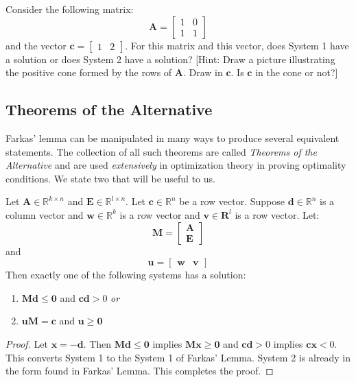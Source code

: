 \begin{exercise} Consider the following matrix: 
\begin{displaymath}
\mathbf{A} = \begin{bmatrix}
1 & 0\\
1 & 1
\end{bmatrix}
\end{displaymath}
and the vector $\mathbf{c} = \begin{bmatrix}1 & 2\end{bmatrix}$. For this matrix and this vector, does System 1 have a solution or does System 2 have a solution? [Hint: Draw a picture illustrating the positive cone formed by the rows of $\mathbf{A}$. Draw in $\mathbf{c}$. Is $\mathbf{c}$ in the cone or not?]
\end{exercise}

\subsection{Theorems of the Alternative}
Farkas' lemma can be manipulated in many ways to produce several equivalent statements. The collection of all such theorems are called \textit{Theorems of the Alternative} and are used \textit{extensively} in optimization theory in proving optimality conditions. We state two that will be useful to us.

\begin{corollary} Let $\mathbf{A} \in \mathbb{R}^{k \times n}$ and $\mathbf{E} \in \mathbb{R}^{l \times n}$.  Let $\mathbf{c} \in \mathbb{R}^n$ be a row vector. Suppose $\mathbf{d} \in \mathbb{R}^n$ is a column vector and $\mathbf{w} \in \mathbb{R}^k$ is a row vector and $\mathbf{v} \in \mathbf{R}^{l}$ is a row vector.  Let:
\begin{displaymath}
\mathbf{M} = \begin{bmatrix}
\mathbf{A}\\
\mathbf{E}
\end{bmatrix}
\end{displaymath}
and
\begin{displaymath}
\mathbf{u} = \begin{bmatrix}
\mathbf{w} & \mathbf{v}
\end{bmatrix}
\end{displaymath}
Then exactly one of the following systems has a solution:
\begin{enumerate}
\item $\mathbf{M}\mathbf{d} \leq \mathbf{0}$ and $\mathbf{c}\mathbf{d} > 0$ \textit{or}
\item $\mathbf{u}\mathbf{M} = \mathbf{c}$ and $\mathbf{u}\geq \mathbf{0}$
\end{enumerate}
\label{cor:KKT}
\end{corollary}
\begin{proof} Let $\mathbf{x} = -\mathbf{d}$. Then $\mathbf{M}\mathbf{d} \leq \mathbf{0}$ implies $\mathbf{M}\mathbf{x} \geq \mathbf{0}$ and $\mathbf{c}\mathbf{d} > 0$ implies $\mathbf{c}\mathbf{x} < 0$. This converts System 1 to the System 1 of Farkas' Lemma. System 2 is already in the form found in Farkas' Lemma. This completes the proof. 
\end{proof}

